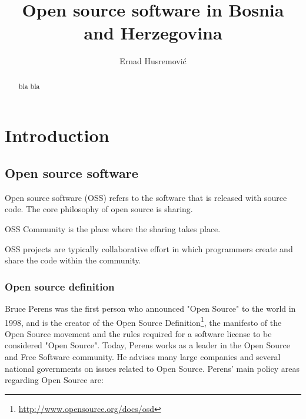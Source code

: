 \documentclass[times, utf8, seminar]{fit}
\begin{document}
\title{Open source software in Bosnia and Herzegovina}

\author{Ernad Husremović}


\maketitle

\tableofcontents

\listoftables
\listoffigures

\begin{abstract}

bla bla 

\end{abstract}


\chapter{Introduction}

\section{Open source software}

Open source software (OSS) refers to the software that is released with source code. The core philosophy of open source is  sharing.

OSS Community is the place where the sharing takes place.

OSS projects are typically collaborative effort in which programmers create and share the code within the community.

\subsection{Open source definition}
Bruce Perens was the first person who announced "Open Source" to the world in 1998, and is the creator of the Open Source Definition\footnote{\url{http://www.opensource.org/docs/osd}}, the manifesto of the Open Source movement and the rules required for a software license to be considered "Open Source"\citep{web:perens}. Today, Perens works as a leader in the Open Source and Free Software community. He advises many large companies and several national governments on issues related to Open Source. Perens' main policy areas regarding Open Source are:
\end{document}

